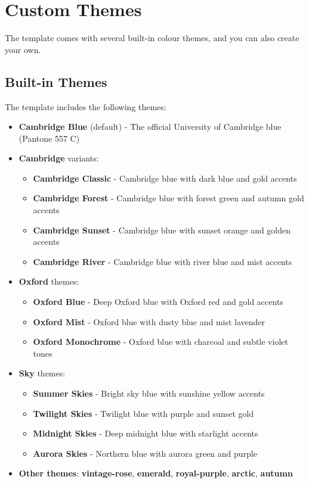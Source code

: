 \documentclass[a4paper,11pt]{article}
\begin{document}
\section{Custom Themes}
The template comes with several built-in colour themes, and you can also create your own.

\subsection{Built-in Themes}
The template includes the following themes:
\begin{itemize}
    \item \textbf{Cambridge Blue} (default) - The official University of Cambridge blue (Pantone 557 C)
    \item \textbf{Cambridge} variants:
    \begin{itemize}
        \item \textbf{Cambridge Classic} - Cambridge blue with dark blue and gold accents
        \item \textbf{Cambridge Forest} - Cambridge blue with forest green and autumn gold accents
        \item \textbf{Cambridge Sunset} - Cambridge blue with sunset orange and golden accents
        \item \textbf{Cambridge River} - Cambridge blue with river blue and mist accents
    \end{itemize}
    \item \textbf{Oxford} themes:
    \begin{itemize}
        \item \textbf{Oxford Blue} - Deep Oxford blue with Oxford red and gold accents
        \item \textbf{Oxford Mist} - Oxford blue with dusty blue and mist lavender
        \item \textbf{Oxford Monochrome} - Oxford blue with charcoal and subtle violet tones
    \end{itemize}
    \item \textbf{Sky} themes:
    \begin{itemize}
        \item \textbf{Summer Skies} - Bright sky blue with sunshine yellow accents
        \item \textbf{Twilight Skies} - Twilight blue with purple and sunset gold
        \item \textbf{Midnight Skies} - Deep midnight blue with starlight accents
        \item \textbf{Aurora Skies} - Northern blue with aurora green and purple
    \end{itemize}
    \item \textbf{Other themes}: \textbf{vintage-rose}, \textbf{emerald}, \textbf{royal-purple}, \textbf{arctic}, \textbf{autumn}
\end{itemize}
\end{document}

